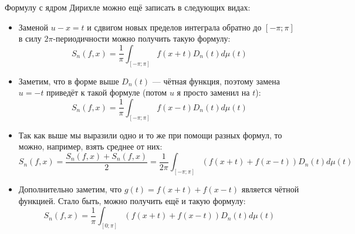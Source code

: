 \begin{note}
	Формулу с ядром Дирихле можно ещё записать в следующих видах:
	\begin{itemize}
		\item Заменой $u - x = t$ и сдвигом новых пределов интеграла обратно до $[-\pi; \pi]$ в силу $2\pi$-периодичности можно получить такую формулу:
		\[
			S_n(f, x) = \frac{1}{\pi} \int_{[-\pi; \pi]} f(x + t)D_n(t)d\mu(t)
		\]
		
		\item Заметим, что в форме выше $D_n(t)$ --- чётная функция, поэтому замена $u = -t$ приведёт к такой формуле (потом $u$ я просто заменил на $t$):
		\[
			S_n(f, x) = \frac{1}{\pi} \int_{[-\pi; \pi]} f(x - t)D_n(t)d\mu(t)
		\]
		
		\item Так как выше мы выразили одно и то же при помощи разных формул, то можно, например, взять среднее от них:
		\[
			S_n(f, x) = \frac{S_n(f, x) + S_n(f, x)}{2} = \frac{1}{2\pi} \int_{[-\pi; \pi]} (f(x + t) + f(x - t))D_n(t)d\mu(t)
		\]
		
		\item Дополнительно заметим, что $g(t) = f(x + t) + f(x - t)$ является чётной функцией. Стало быть, можно получить ещё и такую формулу:
		\[
			S_n(f, x) = \frac{1}{\pi} \int_{[0; \pi]} (f(x + t) + f(x - t))D_n(t)d\mu(t)
		\]
	\end{itemize}
\end{note}